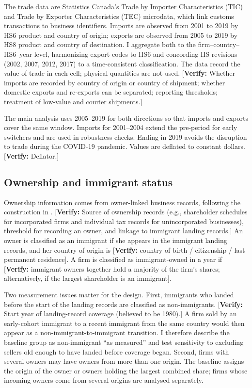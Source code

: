 \documentclass[12pt]{article}
\theoremstyle{remark}
\newcommand{\verify}[1]{\textcolor{BrickRed}{[\textbf{Verify:} #1]}}
\begin{document}
The trade data are Statistics Canada's Trade by Importer Characteristics (TIC)
and Trade by Exporter Characteristics (TEC) microdata, which link customs
transactions to business identifiers. Imports are observed from 2001 to 2019
by HS6 product and country of origin; exports are observed from 2005 to 2019
by HS8 product and country of destination. I aggregate both to the
firm--country--HS6--year level, harmonizing export codes to HS6 and concording
HS revisions (2002, 2007, 2012, 2017) to a time-consistent classification. The
data record the value of trade in each cell; physical quantities are not used.
\verify{Whether imports are recorded by country of origin or country of
shipment; whether domestic exports and re-exports can be separated; reporting
thresholds; treatment of low-value and courier shipments.}

The main analysis uses 2005--2019 for both directions so that imports and
exports cover the same window. Imports for 2001--2004 extend the pre-period
for early switchers and are used in robustness checks. Ending in 2019 avoids
the disruption to trade during the COVID-19 pandemic. Values are deflated to
constant dollars. \verify{Deflator.}

\subsection{Ownership and immigrant status}

Ownership information comes from owner-linked business records, following the
construction in \citet{fung2019}. \verify{Source of ownership records (e.g.,
shareholder schedules for incorporated firms and individual tax records for
unincorporated businesses), threshold for recording an owner, and linkage to
immigrant landing records.} An owner is classified as an immigrant if she
appears in the immigrant landing records, and her country of origin is
\verify{country of birth / citizenship / last permanent residence}. A firm is
classified as immigrant-owned in a year if \verify{immigrant owners together
hold a majority of the firm's shares; alternatively, if the largest
shareholder is an immigrant}.

Two measurement issues matter for the design. First, immigrants who landed
before the start of the landing records are classified as non-immigrants.
\verify{Start year of landing-record coverage (believed to be 1980).} A firm
sold by an early-cohort immigrant to a recent immigrant from the same country
would then appear as a non-immigrant-to-immigrant transition. I therefore
describe the baseline group as non-immigrant ``as measured'' and test
sensitivity to excluding sellers old enough to have landed before coverage
began. Second, firms with several owners may have owners from more than one
origin. The baseline assigns the origin of the owner or owners holding the
largest combined share; firms whose incoming owners come from several origins
are analysed separately.
\end{document}
